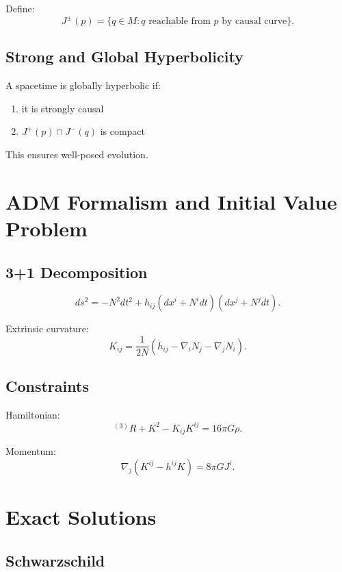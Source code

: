 \documentclass[12pt]{article}
\begin{document}
Define:
\[
J^\pm(p) = \{ q\in M: q \text{ reachable from } p \text{ by causal curve}\}.
\]

\subsection{Strong and Global Hyperbolicity}

A spacetime is globally hyperbolic if:
\begin{enumerate}
\item it is strongly causal
\item $J^+(p)\cap J^-(q)$ is compact
\end{enumerate}

This ensures well-posed evolution.

\section{ADM Formalism and Initial Value Problem}

\subsection{3+1 Decomposition}

\[
ds^2 = -N^2 dt^2 + h_{ij}(dx^i+N^i dt)(dx^j + N^j dt).
\]

Extrinsic curvature:
\[
K_{ij}
= \frac{1}{2N}\left(\dot{h}_{ij} - \nabla_i N_j - \nabla_j N_i\right).
\]

\subsection{Constraints}

Hamiltonian:
\[
{}^{(3)}R + K^2 - K_{ij}K^{ij} = 16\pi G\rho.
\]

Momentum:
\[
\nabla_j(K^{ij}-h^{ij}K)=8\pi G J^i.
\]

\section{Exact Solutions}

\subsection{Schwarzschild}
\end{document}
